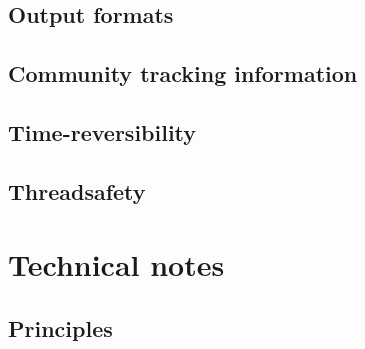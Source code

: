 \documentclass{article}
\begin{document}
\subsection{Output formats}


\subsection{Community tracking information}

\subsection{Time-reversibility}

\subsection{Threadsafety}




\section{Technical notes}
\label{sec:technical}

\subsection{Principles}
\label{sec:principles}
\end{document}
